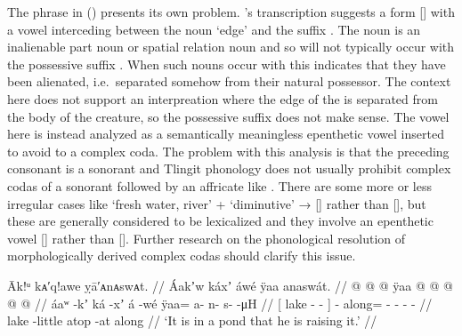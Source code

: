 The phrase  in (\lastx) presents its own problem.
\citeauthor{swanton:1909}’s transcription  suggests a form  [] with a vowel  interceding between the noun  ‘edge’ and the suffix .
The noun  is an inalienable part noun or spatial relation noun and so will not typically occur with the possessive suffix .
When such nouns occur with  this indicates that they have been alienated, i.e.\ separated somehow from their natural possessor.
The context here does not support an interpreation where the edge of the  is separated from the body of the creature, so the possessive suffix does not make sense.
The vowel  here is instead analyzed as a semantically meaningless epenthetic vowel inserted to avoid to a complex coda.
The problem with this analysis is that the preceding consonant  is a sonorant and Tlingit phonology does not usually prohibit complex codas of a sonorant followed by an affricate like .
There are some more or less irregular cases like  ‘fresh water, river’ +  ‘diminutive’ →  [] rather than   [], but these are generally considered to be lexicalized and they involve an epenthetic vowel  [] rather than  [].
Further research on the phonological resolution of morphologically derived complex codas should clarify this issue.

\ex\label{ex:91-161-in-pond-raising-it}%
%
\begingl
	\glpreamble	Āk!ᵘ kᴀ′q!awe ỵā′ᴀnᴀswᴀt. //
	\glpreamble	Áakʼw káxʼ áwé ÿaa anaswát. //
	\gla	{}  @ {}  @ {} {}  @ {}
		ÿaa @  @ {} @ {} @ {} @ {} //
	\glb	{} áaʷ -kʼ ká -xʼ {} á -wé
		ÿaa= a- n- s-  -μH //
	\glc	{}[ lake -  - {}]  -
		along= - - -  - //
	\gld	{} lake -little atop -at {}  {}
		along  {} {} {} {} //
	\glft	‘It is in a pond that he is raising it.’
		//
\endgl
\xe


